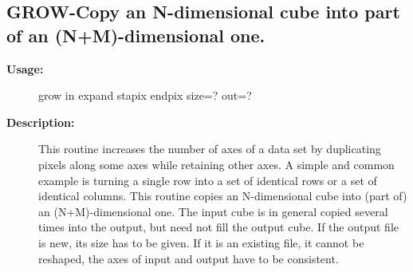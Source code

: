 \subsection{GROW-\label{GROW}Copy an N-dimensional cube into part of an (N+M)-dimensional one.}
\begin{description}

\item [{\bf Usage:}]

   grow in expand stapix endpix size=? out=?


\item [{\bf Description:}]

   This routine increases the number of axes of a data set by
   duplicating pixels along some axes while retaining other axes.
   A simple and common example is turning a single row into a set of
   identical rows or a set of identical columns. This routine copies
   an N-dimensional cube into (part of) an (N+M)-dimensional one. The
   input cube is in general copied several times into the output, but
   need not fill the output cube. If the output file is new, its size
   has to be given. If it is an existing file, it cannot be reshaped,
   the axes of input and output have to be consistent.


\end{description}
